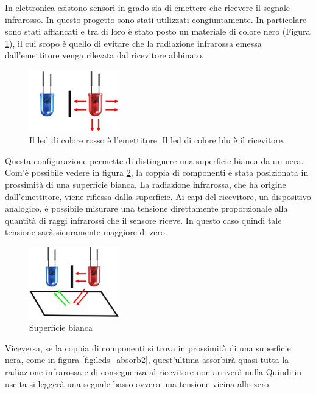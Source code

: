 \documentclass[twoside,twocolumn]{article}
\begin{document}
In elettronica esistono sensori in grado sia di emettere che ricevere il segnale infrarosso. In questo progetto sono stati utilizzati congiuntamente. In particolare sono stati affiancati e tra di loro è stato posto un materiale di colore nero (Figura \ref{fig:coppia}), il cui scopo è quello di evitare che la radiazione infrarossa emessa dall'emettitore venga rilevata dal ricevitore abbinato.

\begin{figure}[h]
	\centering
	\includegraphics[width=0.35\textwidth]{immagini/coppia}
	\caption{Il led di colore rosso è l'emettitore. Il led di colore blu è il ricevitore.}
	\label{fig:coppia}
\end{figure}

Questa configurazione permette di distinguere una superficie bianca da un nera. Com'è possibile vedere in figura \ref{fig:leds_absorb1}, la coppia di componenti è stata posizionata in prossimità di una superficie bianca. La radiazione infrarossa, che ha origine dall'emettitore, viene riflessa dalla superficie. Ai capi del ricevitore, un dispositivo analogico, è possibile misurare una tensione direttamente proporzionale alla quantità di raggi infrarossi che il sensore riceve. In questo caso quindi tale tensione sarà sicuramente maggiore di zero.

\begin{figure}[h]
	\centering
	\includegraphics[width=0.35\textwidth]{immagini/leds_absorb1}
	\caption{Superficie bianca}
	\label{fig:leds_absorb1}
\end{figure}

\newpage
Viceversa, se la coppia di componenti si trova in prossimità di una superficie nera, come in figura  \ref{fig:leds_absorb2}, quest'ultima assorbirà quasi tutta la radiazione infrarossa e di conseguenza al ricevitore non arriverà nulla Quindi in uscita si leggerà una segnale basso ovvero una tensione vicina allo zero.
\end{document}

